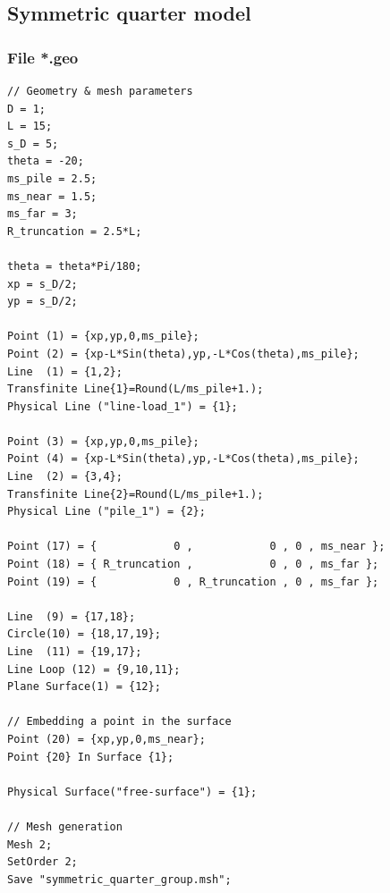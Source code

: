\documentclass[a4]{article}
\begin{document}
\subsection{Symmetric quarter model}

\subsubsection{File *.geo}

\begin{Verbatim}
// Geometry & mesh parameters
D = 1;
L = 15;
s_D = 5; 
theta = -20;  
ms_pile = 2.5;
ms_near = 1.5;
ms_far = 3;
R_truncation = 2.5*L;

theta = theta*Pi/180; 
xp = s_D/2;           
yp = s_D/2;           

Point (1) = {xp,yp,0,ms_pile};                          
Point (2) = {xp-L*Sin(theta),yp,-L*Cos(theta),ms_pile}; 
Line  (1) = {1,2};
Transfinite Line{1}=Round(L/ms_pile+1.);
Physical Line ("line-load_1") = {1};

Point (3) = {xp,yp,0,ms_pile};                           
Point (4) = {xp-L*Sin(theta),yp,-L*Cos(theta),ms_pile};   
Line  (2) = {3,4};
Transfinite Line{2}=Round(L/ms_pile+1.);
Physical Line ("pile_1") = {2};

Point (17) = {            0 ,            0 , 0 , ms_near };
Point (18) = { R_truncation ,            0 , 0 , ms_far };
Point (19) = {            0 , R_truncation , 0 , ms_far };

Line  (9) = {17,18};
Circle(10) = {18,17,19};
Line  (11) = {19,17};
Line Loop (12) = {9,10,11}; 
Plane Surface(1) = {12};

// Embedding a point in the surface 
Point (20) = {xp,yp,0,ms_near};  
Point {20} In Surface {1};

Physical Surface("free-surface") = {1};

// Mesh generation
Mesh 2;
SetOrder 2;
Save "symmetric_quarter_group.msh";
\end{Verbatim}
\end{document}
